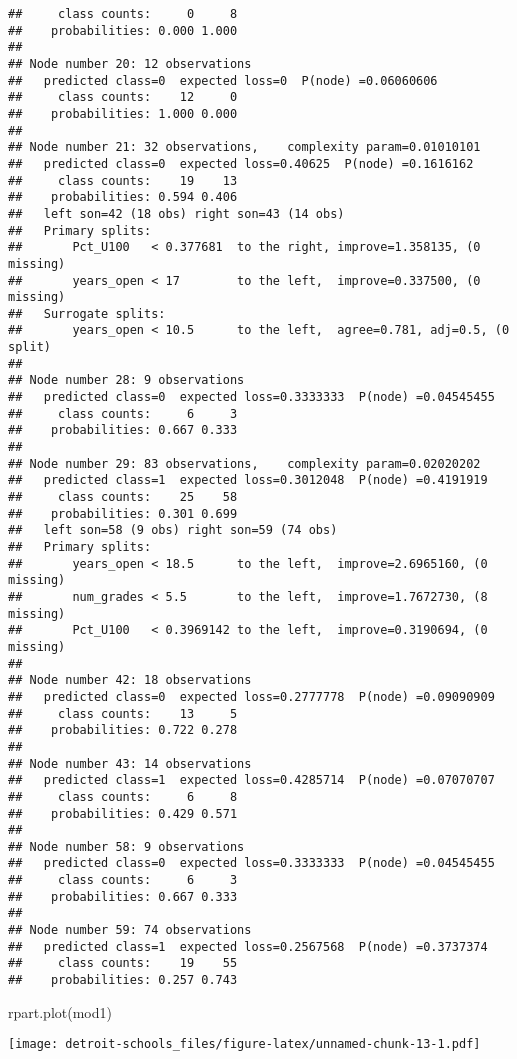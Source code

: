 \documentclass[
]{article}
\newenvironment{Shaded}{\begin{snugshade}}{\end{snugshade}}
\newcommand{\FunctionTok}[1]{\textcolor[rgb]{0.00,0.00,0.00}{#1}}
\newcommand{\NormalTok}[1]{#1}
\begin{document}
\begin{verbatim}
##     class counts:     0     8
##    probabilities: 0.000 1.000 
## 
## Node number 20: 12 observations
##   predicted class=0  expected loss=0  P(node) =0.06060606
##     class counts:    12     0
##    probabilities: 1.000 0.000 
## 
## Node number 21: 32 observations,    complexity param=0.01010101
##   predicted class=0  expected loss=0.40625  P(node) =0.1616162
##     class counts:    19    13
##    probabilities: 0.594 0.406 
##   left son=42 (18 obs) right son=43 (14 obs)
##   Primary splits:
##       Pct_U100   < 0.377681  to the right, improve=1.358135, (0 missing)
##       years_open < 17        to the left,  improve=0.337500, (0 missing)
##   Surrogate splits:
##       years_open < 10.5      to the left,  agree=0.781, adj=0.5, (0 split)
## 
## Node number 28: 9 observations
##   predicted class=0  expected loss=0.3333333  P(node) =0.04545455
##     class counts:     6     3
##    probabilities: 0.667 0.333 
## 
## Node number 29: 83 observations,    complexity param=0.02020202
##   predicted class=1  expected loss=0.3012048  P(node) =0.4191919
##     class counts:    25    58
##    probabilities: 0.301 0.699 
##   left son=58 (9 obs) right son=59 (74 obs)
##   Primary splits:
##       years_open < 18.5      to the left,  improve=2.6965160, (0 missing)
##       num_grades < 5.5       to the left,  improve=1.7672730, (8 missing)
##       Pct_U100   < 0.3969142 to the left,  improve=0.3190694, (0 missing)
## 
## Node number 42: 18 observations
##   predicted class=0  expected loss=0.2777778  P(node) =0.09090909
##     class counts:    13     5
##    probabilities: 0.722 0.278 
## 
## Node number 43: 14 observations
##   predicted class=1  expected loss=0.4285714  P(node) =0.07070707
##     class counts:     6     8
##    probabilities: 0.429 0.571 
## 
## Node number 58: 9 observations
##   predicted class=0  expected loss=0.3333333  P(node) =0.04545455
##     class counts:     6     3
##    probabilities: 0.667 0.333 
## 
## Node number 59: 74 observations
##   predicted class=1  expected loss=0.2567568  P(node) =0.3737374
##     class counts:    19    55
##    probabilities: 0.257 0.743
\end{verbatim}

\begin{Shaded}
\begin{Highlighting}[]
\FunctionTok{rpart.plot}\NormalTok{(mod1)}
\end{Highlighting}
\end{Shaded}

\texttt{[image: detroit-schools\_files/figure-latex/unnamed-chunk-13-1.pdf]}
\end{document}
